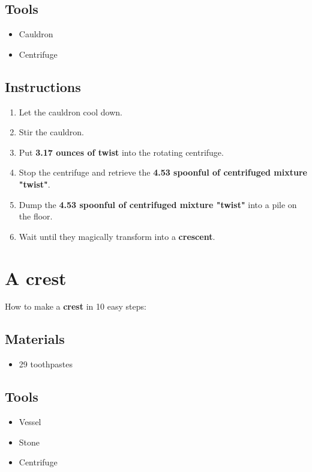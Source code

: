 \documentclass{article}
\begin{document}
\subsection{Tools}\begin{itemize}
\item 
Cauldron
\item 
Centrifuge
\end{itemize}
\subsection{Instructions}\begin{enumerate}
\item 
Let the cauldron cool down.
\item 
Stir the cauldron.
\item 
Put \textbf{3.17 ounces of twist} into the rotating centrifuge.
\item 
Stop the centrifuge and retrieve the \textbf{4.53 spoonful of centrifuged mixture "twist"}.
\item 
Dump the \textbf{4.53 spoonful of centrifuged mixture "twist"} into a pile on the floor.
\item 
Wait until they magically transform into a \textbf{crescent}.
\end{enumerate}
\newpage
\section{A crest}How to make a \textbf{crest} in 10 easy steps:

\subsection{Materials}\begin{itemize}
\item 
29 toothpastes
\end{itemize}
\subsection{Tools}\begin{itemize}
\item 
Vessel
\item 
Stone
\item 
Centrifuge
\end{itemize}
\end{document}

